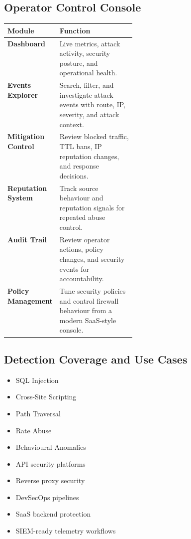\documentclass[11pt,a4paper]{article}
\begin{document}
\subsection{Operator Control Console}
\begin{tabularx}{\linewidth}{@{}>{\bfseries}p{0.30\linewidth}X@{}}
\toprule
Module & Function \\
\midrule
Dashboard & Live metrics, attack activity, security posture, and operational health. \\
Events Explorer & Search, filter, and investigate attack events with route, IP, severity, and attack context. \\
Mitigation Control & Review blocked traffic, TTL bans, IP reputation changes, and response decisions. \\
Reputation System & Track source behaviour and reputation signals for repeated abuse control. \\
Audit Trail & Review operator actions, policy changes, and security events for accountability. \\
Policy Management & Tune security policies and control firewall behaviour from a modern SaaS-style console. \\
\bottomrule
\end{tabularx}

\subsection{Detection Coverage and Use Cases}
\begin{multicols}{2}
\begin{itemize}
  \item SQL Injection
  \item Cross-Site Scripting
  \item Path Traversal
  \item Rate Abuse
  \item Behavioural Anomalies
  \item API security platforms
  \item Reverse proxy security
  \item DevSecOps pipelines
  \item SaaS backend protection
  \item SIEM-ready telemetry workflows
\end{itemize}
\end{multicols}
\end{document}
